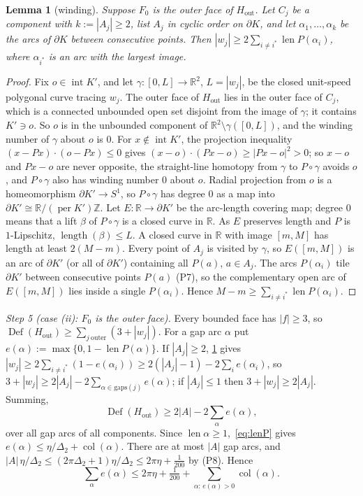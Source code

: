 \documentclass[11pt]{amsart}
\newtheorem{lemma}[theorem]{Lemma}
\theoremstyle{definition}
\theoremstyle{remark}
\newcommand{\R}{\mathbb{R}}
\newcommand{\Dt}{\Delta_2}
\begin{document}
\begin{lemma}[winding]\label{lem:winding}
Suppose $F_0$ is the outer face of $H_{\mathrm{out}}$. Let $C_j$ be a component with $k:=|A_j|\ge2$, list $A_j$ in cyclic order on $\partial K$, and let $\alpha_1,\dots,\alpha_k$ be the arcs of $\partial K$ between consecutive points. Then $|w_j|\ge2\sum_{i\neq i^*}\operatorname{len}P(\alpha_i)$, where $\alpha_{i^*}$ is an arc with the largest image.
\end{lemma}
\begin{proof}
Fix $o\in\operatorname{int}K'$, and let $\gamma:[0,L]\to\R^2$, $L=|w_j|$, be the closed unit-speed polygonal curve tracing $w_j$. The outer face of $H_{\mathrm{out}}$ lies in the outer face of $C_j$, which is a connected unbounded open set disjoint from the image of $\gamma$; it contains $K'\ni o$. So $o$ is in the unbounded component of $\R^2\setminus\gamma([0,L])$, and the winding number of $\gamma$ about $o$ is $0$. For $x\notin\operatorname{int}K'$, the projection inequality $(x-Px)\cdot(o-Px)\le0$ gives $(x-o)\cdot(Px-o)\ge|Px-o|^2>0$; so $x-o$ and $Px-o$ are never opposite, the straight-line homotopy from $\gamma$ to $P\circ\gamma$ avoids $o$, and $P\circ\gamma$ also has winding number $0$ about $o$. Radial projection from $o$ is a homeomorphism $\partial K'\to S^1$, so $P\circ\gamma$ has degree $0$ as a map into $\partial K'\cong\R/(\operatorname{per}K')\mathbb Z$. Let $E:\R\to\partial K'$ be the arc-length covering map; degree $0$ means that a lift $\beta$ of $P\circ\gamma$ is a closed curve in $\R$. As $E$ preserves length and $P$ is $1$-Lipschitz, $\operatorname{length}(\beta)\le L$. A closed curve in $\R$ with image $[m,M]$ has length at least $2(M-m)$. Every point of $A_j$ is visited by $\gamma$, so $E([m,M])$ is an arc of $\partial K'$ (or all of $\partial K'$) containing all $P(a)$, $a\in A_j$. The arcs $P(\alpha_i)$ tile $\partial K'$ between consecutive points $P(a)$ (P7), so the complementary open arc of $E([m,M])$ lies inside a single $P(\alpha_i)$. Hence $M-m\ge\sum_{i\neq i^*}\operatorname{len}P(\alpha_i)$.
\end{proof}

\emph{Step 5 (case (ii): $F_0$ is the outer face).} Every bounded face has $|f|\ge3$, so $\operatorname{Def}(H_{\mathrm{out}})\ge\sum_{j\ \mathrm{outer}}(3+|w_j|)$. For a gap arc $\alpha$ put $e(\alpha):=\max\{0,1-\operatorname{len}P(\alpha)\}$. If $|A_j|\ge2$, \cref{lem:winding} gives $|w_j|\ge2\sum_{i\neq i^*}(1-e(\alpha_i))\ge2(|A_j|-1)-2\sum_ie(\alpha_i)$, so $3+|w_j|\ge2|A_j|-2\sum_{\alpha\in\mathrm{gaps}(j)}e(\alpha)$; if $|A_j|\le1$ then $3+|w_j|\ge2|A_j|$. Summing,
\begin{equation}\label{eq:E51}
\operatorname{Def}(H_{\mathrm{out}})\ge2|A|-2\sum_\alpha e(\alpha),
\end{equation}
over all gap arcs of all components. Since $\operatorname{len}\alpha\ge1$,~\eqref{eq:lenP} gives $e(\alpha)\le\eta/\Dt+\operatorname{col}(\alpha)$. There are at most $|A|$ gap arcs, and $|A|\,\eta/\Dt\le(2\pi\Dt+1)\eta/\Dt\le2\pi\eta+\frac1{200}$ by (P8). Hence
\begin{equation}\label{eq:E52}
\sum_\alpha e(\alpha)\le2\pi\eta+\tfrac1{200}+\sum_{\alpha:\,e(\alpha)>0}\operatorname{col}(\alpha).
\end{equation}
\end{document}
